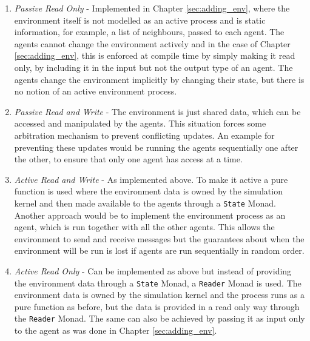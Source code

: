 \begin{enumerate}
	\item \textit{Passive Read Only} - Implemented in Chapter \ref{sec:adding_env}, where the environment itself is not modelled as an active process and is static information, for example, a list of neighbours, passed to each agent. The agents cannot change the environment actively and in the case of Chapter \ref{sec:adding_env}, this is enforced at compile time by simply making it read only, by including it in the input but not the output type of an agent. The agents change the environment implicitly by changing their state, but there is no notion of an active environment process.
	
	\item \textit{Passive Read and Write} - The environment is just shared data, which can be accessed and manipulated by the agents. This situation forces some arbitration mechanism to prevent conflicting updates. An example for preventing these updates would be running the agents sequentially one after the other, to ensure that only one agent has access at a time.
	
	\item \textit{Active Read and Write} - As implemented above. To make it active a pure function is used where the environment data is owned by the simulation kernel and then made available to the agents through a \texttt{State} Monad. Another approach would be to implement the environment process as an agent, which is run together with all the other agents. This allows the environment to send and receive messages but the guarantees about when the environment will be run is lost if agents are run sequentially in random order.
	
	\item \textit{Active Read Only} - Can be implemented as above but instead of providing the environment data through a \texttt{State} Monad, a \texttt{Reader} Monad is used. The environment data is owned by the simulation kernel and the process runs as a pure function as before, but the data is provided in a read only way through the \texttt{Reader} Monad. The same can also be achieved by passing it as input only to the agent as was done in Chapter \ref{sec:adding_env}.
\end{enumerate}
